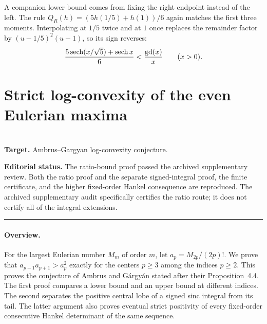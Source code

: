 \documentclass[11pt,a4paper]{article}
\begin{document}
\noindent A companion lower bound comes from fixing the right
endpoint instead of the left. The rule
$Q_R(h)=(5h(1/5)+h(1))/6$ again matches the first three moments.
Interpolating at $1/5$ twice and at $1$ once replaces the remainder
factor by $(u-1/5)^2(u-1)$, so its sign reverses:
\[
 \frac{5\operatorname{sech}(x/\sqrt{5})+\operatorname{sech} x}{6}<\frac{\operatorname{gd}(x)}{x}
 \qquad(x>0).
\]
\endgroup


\clearpage

\section{Strict log-convexity of the even Eulerian maxima}
\label{section:R25K}
\\[3pt]
\noindent\textbf{Target.} Ambrus--Gargyan log-convexity conjecture.

\noindent\textbf{Editorial status.} The ratio-bound proof passed the archived supplementary review. Both the ratio proof and the separate signed-integral proof, the finite certificate, and the higher fixed-order Hankel consequence are reproduced. The archived supplementary audit specifically certifies the ratio route; it does not certify all of the integral extensions.

\smallskip\hrule\medskip



\begingroup
\newcommand{\sinc}{\operatorname{sinc}}
\setcounter{equation}{0}
\renewcommand{\theequation}{\thesection.\arabic{equation}}
\renewcommand{\theHequation}{R25K.\arabic{equation}}
\paragraph{Overview.}
For the largest Eulerian number $M_m$ of order $m$, let
$a_p=M_{2p}/(2p)!$. We prove that $a_{p-1}a_{p+1}>a_p^2$
exactly for the centers $p\ge3$ among the indices $p\ge2$.
This proves the conjecture of Ambrus and G\'argy\'an stated after their
Proposition~4.4. The first proof compares a lower bound and an upper
bound at different indices. The second separates the positive central
lobe of a signed sinc integral from its tail. The latter argument also
proves eventual strict positivity of every fixed-order consecutive
Hankel determinant of the same sequence.
\end{document}
